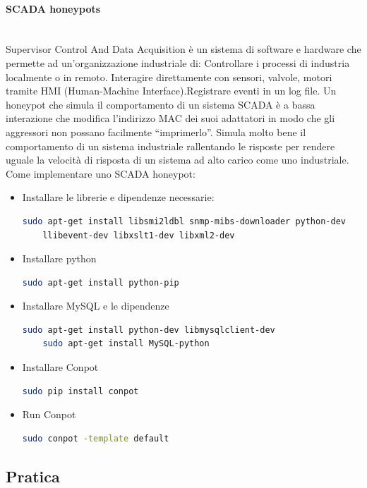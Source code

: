 \documentclass{article}
\begin{document}
\paragraph{SCADA honeypots}
\noindent
\\
Supervisor Control And Data Acquisition è un sistema di software e hardware che permette ad un’organizzazione industriale di:
Controllare i processi di industria localmente o in remoto. Interagire direttamente con sensori, valvole, motori tramite HMI 
(Human-Machine Interface).Registrare eventi in un log file. Un honeypot che simula il comportamento di un sistema SCADA è a 
bassa interazione che modifica l’indirizzo MAC dei suoi adattatori in modo che gli aggressori non possano facilmente “imprimerlo”.
Simula molto bene il comportamento di un sistema industriale rallentando le risposte per rendere uguale la velocità di risposta 
di un sistema ad alto carico come uno industriale. Come implementare uno SCADA honeypot:
\begin{itemize}
    \item Installare le librerie e dipendenze necessarie: 
    \begin{lstlisting}[language=bash]
    sudo apt-get install libsmi2ldbl snmp-mibs-downloader python-dev 
    llibevent-dev libxslt1-dev libxml2-dev
    \end{lstlisting}
    \item Installare python
    \begin{lstlisting}[language=bash]
    sudo apt-get install python-pip
    \end{lstlisting}
    \item Installare MySQL e le dipendenze
    \begin{lstlisting}[language=bash]
    sudo apt-get install python-dev libmysqlclient-dev
    sudo apt-get install MySQL-python
    \end{lstlisting}
    \item Installare Conpot
    \begin{lstlisting}[language=bash]
    sudo pip install conpot
    \end{lstlisting}
    \item Run Conpot
    \begin{lstlisting}[language=bash]
    sudo conpot -template default
    \end{lstlisting}
\end{itemize}
\subsection{Pratica}
\end{document}
